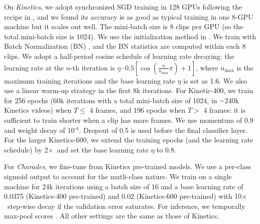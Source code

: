 \documentclass[10pt,twocolumn,letterpaper]{article}
\newcommand{\app}{\raise.17ex\hbox{$\scriptstyle\sim$}}
\def\x{$\times$}
\begin{document}
On \emph{Kinetics}, we adopt synchronized SGD training in 128 GPUs following the recipe in \cite{Goyal2017}, and we found its accuracy is as good as typical training in one 8-GPU machine but it scales out well. 
	The mini-batch size is 8 clips per GPU (so the total mini-batch size is 1024).
We use the initialization method in \cite{He2015}.
	We train with Batch Normalization (BN) \cite{Ioffe2015}, and the BN statistics are computed within each 8 clips.
	We adopt a half-period cosine schedule \cite{Loshchilov2016} of learning rate decaying: the learning rate at the $n$-th iteration is $\eta\cdot0.5[\cos(\frac{n}{n_\text{max}}\pi)+1]$, where $n_\text{max}$ is the maximum training iterations and the base learning rate $\eta$ is set as 1.6.
	We also use a linear warm-up strategy \cite{Goyal2017} in the first 8k iterations.
For Kinetic-400, we train for 256 epochs (60k iterations with a total mini-batch size of 1024, in $\app$240k Kinetics videos) when $T\leq$ 4 frames, and 196 epochs when $T>$ 4 frames: it is sufficient to train shorter when a clip has more frames.
	We use momentum of 0.9 and weight decay of 10$^\text{-4}$. Dropout \cite{Hinton2012b} of 0.5 is used before the final classifier layer.
 	For the larger Kinetics-600, we extend the training epochs (and the learning rate schedule) by 2\x~and set the base learning rate $\eta$ to 0.8.

 	For \emph{Charades}, we fine-tune from Kinetics pre-trained models. We use a per-class sigmoid output to account for the mutli-class nature. We train on a single machine for 24k iterations using a batch size of 16 and a base learning rate of 0.0375 (Kinetics-400 pre-trained) and 0.02 (Kinetics-600  pre-trained) with 10\x~step-wise decay if the validation error saturates. For inference, we temporally max-pool scores \cite{Wang2018}. All other settings are the same as those of Kinetics.

	{
		\small
		
		
	}
	
	
	
	\cleardoublepage
		
	
\end{document}
